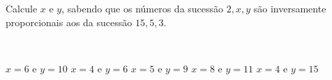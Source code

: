 \parbox{\linewidth}{

Calcule $x$ e $y$, sabendo que os números da sucessão $2, x, y$ são inversamente proporcionais aos da sucessão $15, 5, 3$.}\vspace{2mm}\\\parbox{\linewidth}{

$x=6$ e $y=10$
$x=4$ e $y=6$
$x=5$ e $y=9$
$x=8$ e $y=11$
$x=4$ e $y=15$

}

